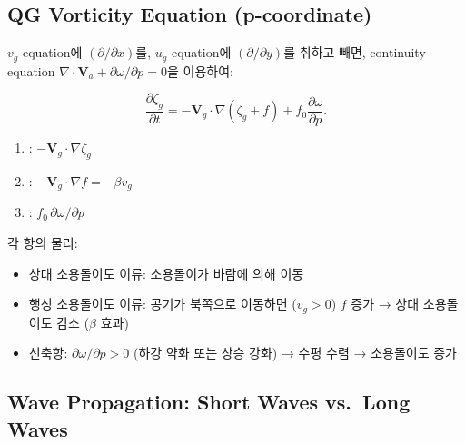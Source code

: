 \subsection{QG Vorticity Equation (p-coordinate)}\label{subsec:qg-vort-p}

$v_g$-equation에 $(\partial/\partial x)$를, $u_g$-equation에
$(\partial/\partial y)$를 취하고 빼면, continuity equation
$\nabla\cdot\mathbf{V}_a + \partial\omega/\partial p = 0$을 이용하여:

\begin{equation}\label{eq:qg-vort-p}
  \boxed{
  \frac{\partial\zeta_g}{\partial t}
  = -\mathbf{V}_g\cdot\nabla(\zeta_g + f)
    + f_0\frac{\partial\omega}{\partial p}.
  }
\end{equation}

\begin{remark}
\begin{enumerate}
  \item {}:
        $-\mathbf{V}_g\cdot\nabla\zeta_g$
  \item {}:
        $-\mathbf{V}_g\cdot\nabla f = -\beta v_g$
  \item {}:
        $f_0\,\partial\omega/\partial p$
\end{enumerate}
\end{remark}

\begin{hisublock}
각 항의 물리:
\begin{itemize}
  \item 상대 소용돌이도 이류: 소용돌이가 바람에 의해 이동
  \item 행성 소용돌이도 이류: 공기가 북쪽으로 이동하면 ($v_g > 0$) $f$ 증가
        → 상대 소용돌이도 감소 ($\beta$ 효과)
  \item 신축항: $\partial\omega/\partial p > 0$ (하강 약화 또는 상승 강화)
        → 수평 수렴 → 소용돌이도 증가
\end{itemize}
\end{hisublock}

\subsection{Wave Propagation: Short Waves vs.\ Long Waves}
\label{subsec:short-long-waves}

